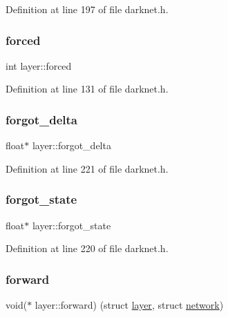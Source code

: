 Definition at line 197 of file darknet.\+h.

\mbox{\label{structlayer_acf386a1f7b93955cc5d04513bb4e4649}} 
\subsubsection{\texorpdfstring{forced}{forced}}
{\footnotesize\ttfamily int layer\+::forced}



Definition at line 131 of file darknet.\+h.

\mbox{\label{structlayer_a03015ecf4e0ca81f3b0133c93cab1354}} 
\subsubsection{\texorpdfstring{forgot\_delta}{forgot\_delta}}
{\footnotesize\ttfamily float$\ast$ layer\+::forgot\+\_\+delta}



Definition at line 221 of file darknet.\+h.

\mbox{\label{structlayer_a8c96fb4f8b4a7d7dac14d6220938bdc3}} 
\subsubsection{\texorpdfstring{forgot\_state}{forgot\_state}}
{\footnotesize\ttfamily float$\ast$ layer\+::forgot\+\_\+state}



Definition at line 220 of file darknet.\+h.

\mbox{\label{structlayer_ad587958fc9c301a5987df7b3d68a09c1}} 
\subsubsection{\texorpdfstring{forward}{forward}}
{\footnotesize\ttfamily void($\ast$ layer\+::forward) (struct \mbox{\hyperlink{structlayer}{layer}}, struct \mbox{\hyperlink{structnetwork}{network}})}



